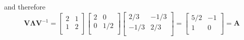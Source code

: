 \documentclass[12pt,a4paper]{article}
\begin{document}
\begin{itemize}
\begin{itemize}
\begin{equation}
    \end{equation}
    and therefore
    \begin{equation}\nonumber%
      \bm{V}\bm{\Lambda}\bm{V}^{-1}
      = 
      \begin{bmatrix}
        2 & 1 \\
        1 & 2 \\
      \end{bmatrix}
      \begin{bmatrix}
        2 & 0 \\
        0 & 1/2 \\
      \end{bmatrix}
      \begin{bmatrix}
        2/3 & -1/3 \\
        -1/3 & 2/3 \\
      \end{bmatrix}
      = 
      \begin{bmatrix}
        5/2 & -1 \\
        1 & 0 \\
      \end{bmatrix}
      = \bm{A}
    \end{equation}
  \end{itemize}
  

\end{itemize}
\end{document}

